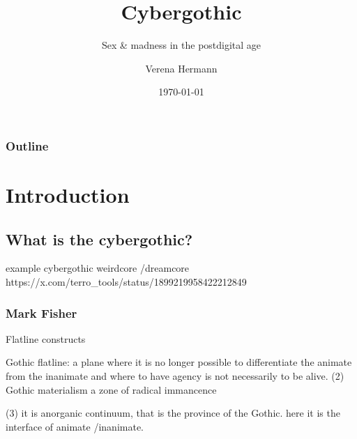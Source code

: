 \documentclass{beamer}
\title{Cybergothic}
\subtitle{Sex \& madness in the postdigital age}
\author{Verena Hermann}
\institute{Desire Direct}
\date{\today}
\begin{document}
\begin{frame}
	\titlepage
\end{frame}



\begin{frame}
\frametitle{Outline}
\tableofcontents

	\section{Introduction}
	\subsection{What is the cybergothic?}
\end{frame}

\begin{frame}
	example cybergothic
	weirdcore /dreamcore
	https://x.com/terro_tools/status/1899219958422212849
			\end{frame}



\begin{frame}
\frametitle{Mark Fisher}
Flatline constructs

Gothic flatline: a plane where it is no longer possible to differentiate the animate from 
the inanimate and where to have agency is not necessarily to be alive.
(2)
Gothic materialism
a zone of  radical immancence

(3) it is anorganic continuum, that is the province of the Gothic.
here it is the interface of animate /inanimate.

\end{frame}
\end{document}
